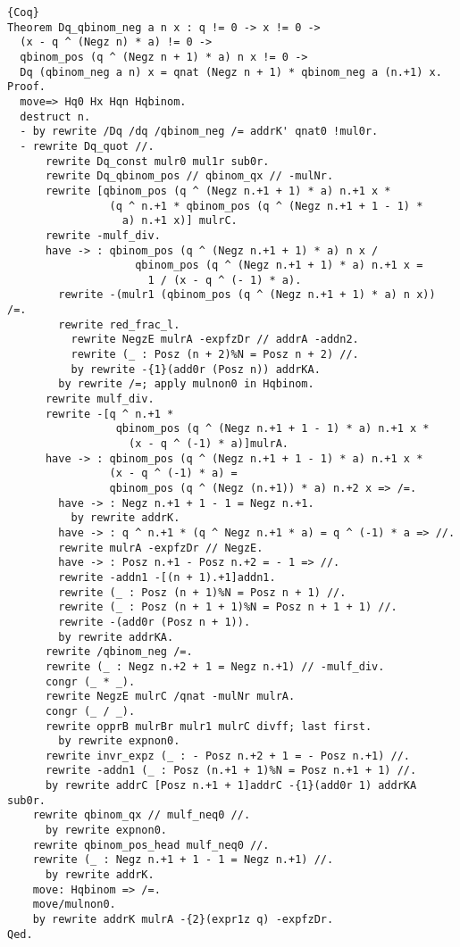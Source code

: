 \documentclass[11pt]{jarticle}
\theoremstyle{mystyle}
\newcommand{\0}{\textbf{0}}
\newcommand{\1}{\textbf{1}}
\newcommand{\2}{\textbf{2}}
\begin{document}
\begin{lstlisting}{Coq}
Theorem Dq_qbinom_neg a n x : q != 0 -> x != 0 ->
  (x - q ^ (Negz n) * a) != 0 ->
  qbinom_pos (q ^ (Negz n + 1) * a) n x != 0 ->
  Dq (qbinom_neg a n) x = qnat (Negz n + 1) * qbinom_neg a (n.+1) x.
Proof.
  move=> Hq0 Hx Hqn Hqbinom.
  destruct n.
  - by rewrite /Dq /dq /qbinom_neg /= addrK' qnat0 !mul0r.
  - rewrite Dq_quot //.
      rewrite Dq_const mulr0 mul1r sub0r.
      rewrite Dq_qbinom_pos // qbinom_qx // -mulNr.
      rewrite [qbinom_pos (q ^ (Negz n.+1 + 1) * a) n.+1 x *
                (q ^ n.+1 * qbinom_pos (q ^ (Negz n.+1 + 1 - 1) *
                  a) n.+1 x)] mulrC.
      rewrite -mulf_div.
      have -> : qbinom_pos (q ^ (Negz n.+1 + 1) * a) n x /
                    qbinom_pos (q ^ (Negz n.+1 + 1) * a) n.+1 x =
                      1 / (x - q ^ (- 1) * a).
        rewrite -(mulr1 (qbinom_pos (q ^ (Negz n.+1 + 1) * a) n x)) /=.
        rewrite red_frac_l.
          rewrite NegzE mulrA -expfzDr // addrA -addn2.
          rewrite (_ : Posz (n + 2)%N = Posz n + 2) //.
          by rewrite -{1}(add0r (Posz n)) addrKA.
        by rewrite /=; apply mulnon0 in Hqbinom.
      rewrite mulf_div.
      rewrite -[q ^ n.+1 *
                 qbinom_pos (q ^ (Negz n.+1 + 1 - 1) * a) n.+1 x *
                   (x - q ^ (-1) * a)]mulrA.
      have -> : qbinom_pos (q ^ (Negz n.+1 + 1 - 1) * a) n.+1 x *
                (x - q ^ (-1) * a) =
                qbinom_pos (q ^ (Negz (n.+1)) * a) n.+2 x => /=.
        have -> : Negz n.+1 + 1 - 1 = Negz n.+1.
          by rewrite addrK.
        have -> : q ^ n.+1 * (q ^ Negz n.+1 * a) = q ^ (-1) * a => //.
        rewrite mulrA -expfzDr // NegzE.
        have -> : Posz n.+1 - Posz n.+2 = - 1 => //.
        rewrite -addn1 -[(n + 1).+1]addn1.
        rewrite (_ : Posz (n + 1)%N = Posz n + 1) //.
        rewrite (_ : Posz (n + 1 + 1)%N = Posz n + 1 + 1) //.
        rewrite -(add0r (Posz n + 1)).
        by rewrite addrKA.
      rewrite /qbinom_neg /=.
      rewrite (_ : Negz n.+2 + 1 = Negz n.+1) // -mulf_div.
      congr (_ * _).
      rewrite NegzE mulrC /qnat -mulNr mulrA.
      congr (_ / _).
      rewrite opprB mulrBr mulr1 mulrC divff; last first.
        by rewrite expnon0.
      rewrite invr_expz (_ : - Posz n.+2 + 1 = - Posz n.+1) //.
      rewrite -addn1 (_ : Posz (n.+1 + 1)%N = Posz n.+1 + 1) //.
      by rewrite addrC [Posz n.+1 + 1]addrC -{1}(add0r 1) addrKA sub0r.
    rewrite qbinom_qx // mulf_neq0 //.
      by rewrite expnon0.
    rewrite qbinom_pos_head mulf_neq0 //.
    rewrite (_ : Negz n.+1 + 1 - 1 = Negz n.+1) //.
      by rewrite addrK.
    move: Hqbinom => /=.
    move/mulnon0.
    by rewrite addrK mulrA -{2}(expr1z q) -expfzDr.
Qed.\end{lstlisting}
\end{document}
